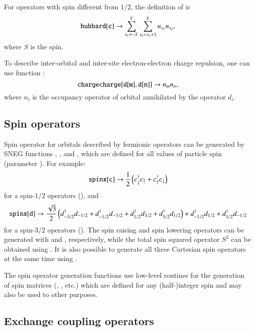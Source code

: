 \documentclass[3p,number,preprint]{elsarticle}
\begin{document}
For operators with spin different from $1/2$, the definition of
 is
%
\begin{equation}
{\tt hubbard[c]} \to \sum_{s_1=-S}^S \sum_{s_2=s_1+1}^S n_{s_1}
n_{s_2},
\end{equation}
%
where $S$ is the spin.

To describe inter-orbital and inter-site electron-electron charge
repulsion, one can use function :
%
\begin{equation}
{\tt chargecharge[d[m],d[n]]} \to n_{m} n_{n},
\end{equation}
%
where $n_i$ is the occupancy operator of orbital annihilated by the
operator $d_i$.


\subsection{Spin operators}

Spin operator for orbitals described by fermionic operators can be
generated by SNEG functions , , and ,
which are defined for all values of particle spin (parameter
). For example:
%
\begin{equation}
{\tt spinx[c]} \to 
\frac{1}{2} \left( c^\dag_\downarrow c_\uparrow + c^\dag_\uparrow
c_\downarrow \right)
\end{equation}
%
for a spin-$1/2$ operators (), and
%
\begin{equation}
{\tt spinx[d]} \to
\frac{\sqrt{3}}{2} \left( d^\dag_{-3/2} d_{-1/2} + d^\dag_{-1/2}
d_{-3/2} + d^\dag_{1/2} d_{3/2} + d^\dag_{3/2} d_{1/2} \right)
+ d^\dag_{-1/2} d_{1/2} + d^\dag_{1/2} d_{-1/2}
\end{equation}
%
for a spin-$3/2$ operators (). The spin raising
and spin lowering operators can be generated with  and
, respectively, while the total spin squared operator
$S^2$ can be obtained using . It is also possible to
generate all three Cartesian spin operators at the same time using
.

The spin operator generation functions use low-level routines for the
generation of spin matrices (, ,
etc.) which are defined for any (half-)integer spin and may also be
used to other purposes.


\subsection{Exchange coupling operators}
\end{document}

